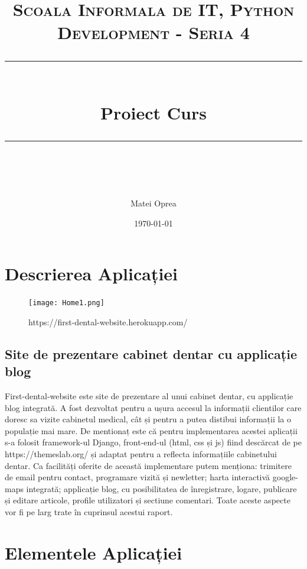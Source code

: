 \documentclass[11pt]{scrartcl} %
\title{	
	\normalfont\normalsize
	\textsc{Scoala Informala de IT, Python Development - Seria 4}\\ %
	\vspace{25pt} %
	\rule{\linewidth}{0.5pt}\\ %
	\vspace{20pt} %
	{\huge Proiect Curs}\\ %
	\vspace{12pt} %
	\rule{\linewidth}{2pt}\\ %
	\vspace{12pt} %
}
\author{\LARGE Matei Oprea} %
\date{\normalsize\today} %
\begin{document}
\maketitle %


\section{Descrierea Aplicației}

\begin{figure}[h] %
	\centering
	\texttt{[image: Home1.png]} %
	\caption{https://first-dental-website.herokuapp.com/}
\end{figure}


\subsection{Site de prezentare cabinet dentar cu applicație blog}

First-dental-website este site de prezentare al unui cabinet dentar, cu applicație blog integrată. A fost dezvoltat pentru a ușura accesul la informații clientilor care doresc sa vizite cabinetul medical, cât și pentru a putea distibui informații la o populație mai mare. De mentionaț este că pentru implementarea acestei aplicații s-a folosit framework-ul Django, front-end-ul (html, css și js) fiind descărcat de pe https://themeslab.org/ și adaptat pentru a reflecta informațiile cabinetului dentar. Ca facilități oferite de această implementare putem menționa: trimitere de email pentru contact, programare vizită și newletter; harta interactivă google-maps integrată; applicație blog, cu posibilitatea de înregistrare, logare, publicare și editare articole, profile utilizatori și sectiune comentari. Toate aceste aspecte vor fi pe larg trate în cuprinsul acestui raport. 


\section{Elementele Aplicației}
\end{document}
